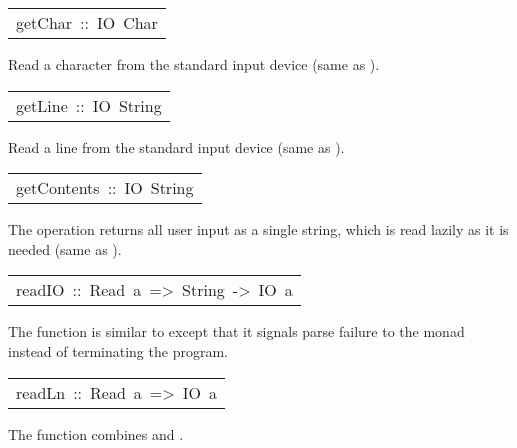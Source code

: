 \begin{haddockdesc}
\item[\begin{tabular}{@{}l}
getChar\ ::\ IO\ Char
\end{tabular}]\haddockbegindoc
Read a character from the standard input device
 (same as  ).
\par

\end{haddockdesc}
\begin{haddockdesc}
\item[\begin{tabular}{@{}l}
getLine\ ::\ IO\ String
\end{tabular}]\haddockbegindoc
Read a line from the standard input device
 (same as  ).
\par

\end{haddockdesc}
\begin{haddockdesc}
\item[\begin{tabular}{@{}l}
getContents\ ::\ IO\ String
\end{tabular}]\haddockbegindoc
The  operation returns all user input as a single string,
 which is read lazily as it is needed
 (same as  ).
\par

\end{haddockdesc}
\begin{haddockdesc}
\item[\begin{tabular}{@{}l}
readIO\ ::\ Read\ a\ =>\ String\ ->\ IO\ a
\end{tabular}]\haddockbegindoc
The  function is similar to  except that it signals
 parse failure to the  monad instead of terminating the program.
\par

\end{haddockdesc}
\begin{haddockdesc}
\item[\begin{tabular}{@{}l}
readLn\ ::\ Read\ a\ =>\ IO\ a
\end{tabular}]\haddockbegindoc
The  function combines  and .
\par

\end{haddockdesc}